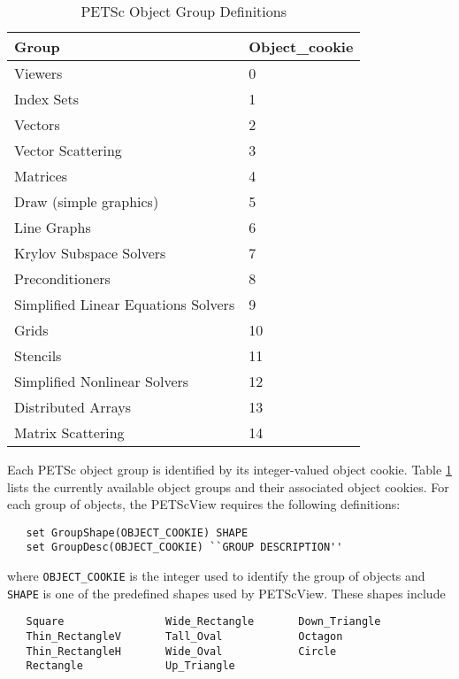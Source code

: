 \begin{table}
\begin{center}
\begin{tabular}{||l||l||} \hline
{\bf Group}                              & {\bf Object\_cookie} \\
\hline
Viewers                            &  0 \\
Index Sets                         &  1 \\
Vectors                            &  2 \\
Vector Scattering                  &  3 \\
Matrices                           &  4 \\
Draw (simple graphics)             &  5 \\
Line Graphs                        &  6 \\
Krylov Subspace Solvers            &  7 \\
Preconditioners                    &  8 \\
Simplified Linear Equations Solvers     &  9 \\
Grids                              & 10 \\
Stencils                           & 11 \\
Simplified Nonlinear Solvers 	   & 12 \\
Distributed Arrays                 & 13 \\
Matrix Scattering                  & 14 \\
\hline
\end{tabular}
\end{center}
\caption{PETSc Object Group Definitions}
\label{PETSc_object_definitions}
\end{table}

Each PETSc object group is identified by its integer-valued object
cookie.  Table \ref{PETSc_object_definitions} lists the
currently available object groups and their associated object cookies.
For each group of objects, the PETScView requires the following
definitions:
\begin{verbatim}
   set GroupShape(OBJECT_COOKIE) SHAPE 
   set GroupDesc(OBJECT_COOKIE) ``GROUP DESCRIPTION''
\end{verbatim}
where {\tt OBJECT\_COOKIE} is the integer used to identify the group
of objects and {\tt SHAPE} is one of the predefined shapes used by
PETScView.  These shapes include
\begin{verbatim}
   Square                Wide_Rectangle       Down_Triangle
   Thin_RectangleV       Tall_Oval            Octagon
   Thin_RectangleH       Wide_Oval            Circle
   Rectangle             Up_Triangle
\end{verbatim}

